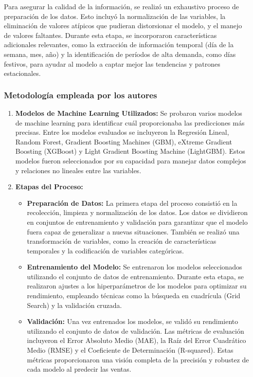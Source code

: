 Para asegurar la calidad de la información, se realizó un exhaustivo proceso de preparación de los datos. Esto incluyó la normalización de las variables, la eliminación de valores atípicos que pudieran distorsionar el modelo, y el manejo de valores faltantes. Durante esta etapa, se incorporaron características adicionales relevantes, como la extracción de información temporal (día de la semana, mes, año) y la identificación de períodos de alta demanda, como días festivos, para ayudar al modelo a captar mejor las tendencias y patrones estacionales.

\subsubsection{Metodología empleada por los autores}
\begin{enumerate}
	\item \textbf{Modelos de Machine Learning Utilizados:} Se probaron varios modelos de machine learning para identificar cuál proporcionaba las predicciones más precisas. Entre los modelos evaluados se incluyeron la Regresión Lineal, Random Forest, Gradient Boosting Machines (GBM), eXtreme Gradient Boosting (XGBoost) y Light Gradient Boosting Machine (LightGBM). Estos modelos fueron seleccionados por su capacidad para manejar datos complejos y relaciones no lineales entre las variables.
	\item \textbf{Etapas del Proceso:}
	\begin{itemize}
		\item \textbf{Preparación de Datos:} La primera etapa del proceso consistió en la recolección, limpieza y normalización de los datos. Los datos se dividieron en conjuntos de entrenamiento y validación para garantizar que el modelo fuera capaz de generalizar a nuevas situaciones. También se realizó una transformación de variables, como la creación de características temporales y la codificación de variables categóricas.
		\item \textbf{Entrenamiento del Modelo:} Se entrenaron los modelos seleccionados utilizando el conjunto de datos de entrenamiento. Durante esta etapa, se realizaron ajustes a los hiperparámetros de los modelos para optimizar su rendimiento, empleando técnicas como la búsqueda en cuadrícula (Grid Search) y la validación cruzada.
		\item \textbf{Validación:} Una vez entrenados los modelos, se validó su rendimiento utilizando el conjunto de datos de validación. Las métricas de evaluación incluyeron el Error Absoluto Medio (MAE), la Raíz del Error Cuadrático Medio (RMSE) y el Coeficiente de Determinación (R-squared). Estas métricas proporcionaron una visión completa de la precisión y robustez de cada modelo al predecir las ventas.

\end{itemize}
\end{enumerate}
